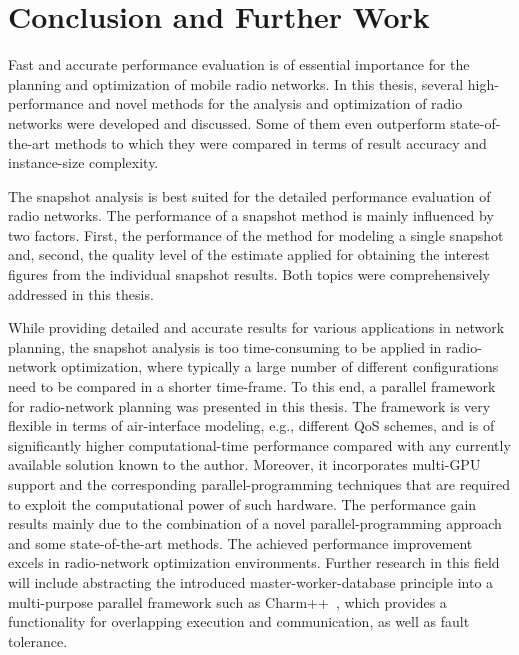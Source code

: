 
\chapter{Conclusion and Further Work \label{chap:Conclusion}}

Fast and accurate performance evaluation is of essential importance
for the planning and optimization of mobile radio networks. In this
thesis, several high-performance and novel methods for the analysis
and optimization of radio networks were developed and discussed. Some
of them even outperform state-of-the-art methods to which they were
compared in terms of result accuracy and instance-size complexity.

The snapshot analysis is best suited for the detailed performance
evaluation of radio networks. The performance of a snapshot method
is mainly influenced by two factors. First, the performance of the
method for modeling a single snapshot and, second, the quality level
of the estimate applied for obtaining the interest figures from the
individual snapshot results. Both topics were comprehensively addressed
in this thesis.

While providing detailed and accurate results for various applications
in network planning, the snapshot analysis is too time-consuming to
be applied in radio-network optimization, where typically a large
number of different configurations need to be compared in a shorter
time-frame. To this end, a parallel framework for radio-network planning
was presented in this thesis. The framework is very flexible in terms
of air-interface modeling, e.g., different QoS schemes, and is of
significantly higher computational-time performance compared with
any currently available solution known to the author. Moreover, it
incorporates multi-GPU support and the corresponding parallel-programming
techniques that are required to exploit the computational power of
such hardware. The performance gain results mainly due to the combination
of a novel parallel-programming approach and some state-of-the-art
methods. The achieved performance improvement excels in radio-network
optimization environments. Further research in this field will include
abstracting the introduced master-worker-database principle into a
multi-purpose parallel framework such as Charm++~\cite{Kale-The_Charm_Approach:2013},
which provides a functionality for overlapping execution and communication,
as well as fault tolerance.

